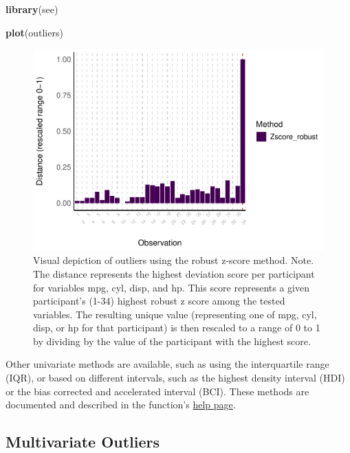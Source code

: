 \documentclass[sn-basic, lineno,pdflatex]{sn-jnl}
\newenvironment{Shaded}{\begin{snugshade}}{\end{snugshade}}
\newcommand{\FunctionTok}[1]{\textcolor[rgb]{0.13,0.29,0.53}{\textbf{#1}}}
\newcommand{\NormalTok}[1]{#1}
\begin{document}
\begin{Shaded}
\begin{Highlighting}[]
\FunctionTok{library}\NormalTok{(see)}

\FunctionTok{plot}\NormalTok{(outliers)}
\end{Highlighting}
\end{Shaded}

\begin{figure}
\includegraphics[width=1\linewidth]{paper_files/figure-latex/univariate_implicit-1} \caption{Visual depiction of outliers using the robust z-score method. Note. The distance represents the highest deviation score per participant for variables mpg, cyl, disp, and hp. This score represents a given participant’s (1-34) highest robust z score among the tested variables. The resulting unique value (representing one of mpg, cyl, disp, or hp for that participant) is then rescaled to a range of 0 to 1 by dividing by the value of the participant with the highest score.}\label{fig:univariate_implicit}
\end{figure}

Other univariate methods are available, such as using the interquartile
range (IQR), or based on different intervals, such as the highest
density interval (HDI) or the bias corrected and accelerated interval
(BCI). These methods are documented and described in the function's
\href{https://easystats.github.io/performance/reference/check_outliers.html}{help
page}.

\subsection{Multivariate Outliers}\label{multivariate-outliers}
\end{document}
